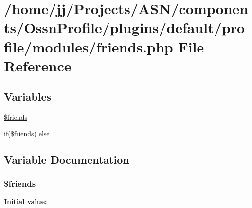 \hypertarget{_ossn_profile_2plugins_2default_2profile_2modules_2friends_8php}{}\section{/home/jj/\+Projects/\+A\+S\+N/components/\+Ossn\+Profile/plugins/default/profile/modules/friends.php File Reference}
\label{_ossn_profile_2plugins_2default_2profile_2modules_2friends_8php}
\subsection*{Variables}
\begin{DoxyCompactItemize}
\item 
\hyperlink{_ossn_profile_2plugins_2default_2profile_2modules_2friends_8php_afb66104a0d5a5b286634a265d216b8d6}{\$friends}
\item 
\hyperlink{jquery_8tokeninput_8js_ad8dd46a3cbc004569e34401e9e71771a}{if}(\$friends) \hyperlink{_ossn_profile_2plugins_2default_2profile_2modules_2friends_8php_a8daa37e6a3658227b53d42241a6fdeba}{else}
\end{DoxyCompactItemize}


\subsection{Variable Documentation}
\subsubsection[{\texorpdfstring{\$friends}{$friends}}]{\setlength{\rightskip}{0pt plus 5cm}\$friends}\hypertarget{_ossn_profile_2plugins_2default_2profile_2modules_2friends_8php_afb66104a0d5a5b286634a265d216b8d6}{}\label{_ossn_profile_2plugins_2default_2profile_2modules_2friends_8php_afb66104a0d5a5b286634a265d216b8d6}
{\bfseries Initial value\+:}


